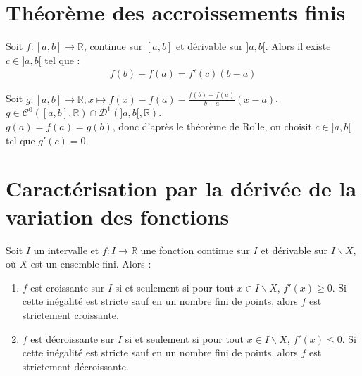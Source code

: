 \documentclass[../main.tex]{subfiles}
\begin{document}
\section{Théorème des accroissements finis}
\begin{tcolorbox}[title=Théorème 18.21, title filled=false, colframe=orange, colback=orange!10!white]
    Soit $f:[a, b]\to \mathbb{R}$, continue sur $[a, b]$ et dérivable sur $]a, b[$. Alors il existe $c\in ]a, b[$ tel que :
    \begin{align*}
        f(b) - f(a) = f'(c)(b - a)
    \end{align*}
\end{tcolorbox}

\noindent Soit $g:[a, b] \to \mathbb{R}; x \mapsto f(x) - f(a) - \frac{f(b) - f(a)}{b - a}(x - a)$. \\
$g \in \mathcal{C}^0([a, b], \mathbb{R}) \cap \mathcal{D}^1(]a, b[, \mathbb{R})$. \\
$g(a) = f(a) = g(b)$, donc d'après le théorème de Rolle, on choisit $c\in ]a, b[$ tel que $g'(c) = 0$.

\section{Caractérisation par la dérivée de la variation des fonctions}
\begin{tcolorbox}[title=Théorème 18.37, title filled=false, colframe=orange, colback=orange!10!white]
    Soit $I$ un intervalle et $f:I\to \mathbb{R}$ une fonction continue sur $I$ et dérivable sur $I \backslash X$, où $X$ est un ensemble fini. Alors : 
    \begin{enumerate}
        \item $f$ est croissante sur $I$ si et seulement si pour tout $x\in I\backslash X$, $f'(x) \geq 0$. Si cette inégalité est stricte sauf en un nombre fini de points, alors $f$ est strictement croissante.
        \item $f$ est décroissante sur $I$ si et seulement si pour tout $x\in I\backslash X$, $f'(x) \leq 0$. Si cette inégalité est stricte sauf en un nombre fini de points, alors $f$ est strictement décroissante.
    \end{enumerate}
\end{tcolorbox}
\end{document}
